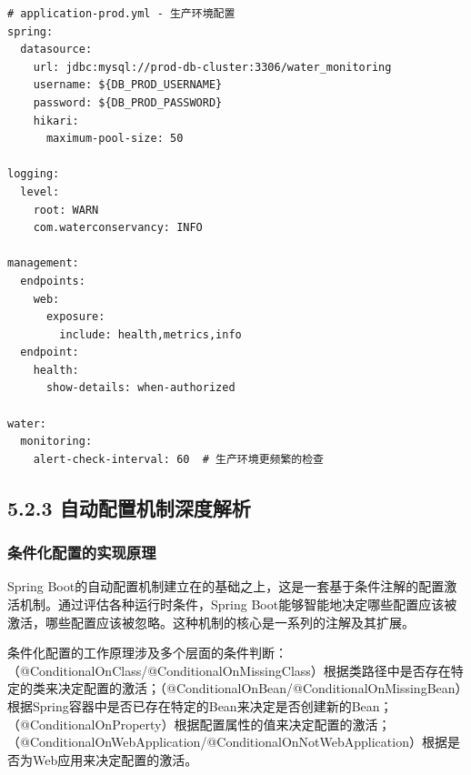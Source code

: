 \begin{lstlisting}
# application-prod.yml - 生产环境配置
spring:
  datasource:
    url: jdbc:mysql://prod-db-cluster:3306/water_monitoring
    username: ${DB_PROD_USERNAME}
    password: ${DB_PROD_PASSWORD}
    hikari:
      maximum-pool-size: 50
      
logging:
  level:
    root: WARN
    com.waterconservancy: INFO
    
management:
  endpoints:
    web:
      exposure:
        include: health,metrics,info
  endpoint:
    health:
      show-details: when-authorized

water:
  monitoring:
    alert-check-interval: 60  # 生产环境更频繁的检查
\end{lstlisting}

\hypertarget{ux81eaux52a8ux914dux7f6eux673aux5236ux6df1ux5ea6ux89e3ux6790-1}{%
\subsection{5.2.3 自动配置机制深度解析}\label{ux81eaux52a8ux914dux7f6eux673aux5236ux6df1ux5ea6ux89e3ux6790-1}}

\hypertarget{ux6761ux4ef6ux5316ux914dux7f6eux7684ux5b9eux73b0ux539fux7406}{%
\subsubsection{条件化配置的实现原理}\label{ux6761ux4ef6ux5316ux914dux7f6eux7684ux5b9eux73b0ux539fux7406}}

Spring Boot的自动配置机制建立在的基础之上，这是一套基于条件注解的配置激活机制。通过评估各种运行时条件，Spring Boot能够智能地决定哪些配置应该被激活，哪些配置应该被忽略。这种机制的核心是一系列的注解及其扩展。

条件化配置的工作原理涉及多个层面的条件判断：（@ConditionalOnClass/@ConditionalOnMissingClass）根据类路径中是否存在特定的类来决定配置的激活；（@ConditionalOnBean/@ConditionalOnMissingBean）根据Spring容器中是否已存在特定的Bean来决定是否创建新的Bean；（@ConditionalOnProperty）根据配置属性的值来决定配置的激活；（@ConditionalOnWebApplication/@ConditionalOnNotWebApplication）根据是否为Web应用来决定配置的激活。

